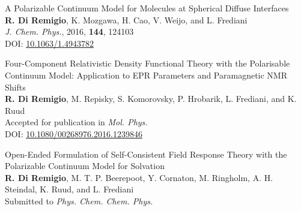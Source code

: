{\Large
\noindent\textsf{A Polarizable Continuum Model for Molecules at Spherical
Diffuse Interfaces
}
\\
    \textbf{R. Di Remigio}, K. Mozgawa, H. Cao, V. Weijo, and L.
    Frediani
\\
    \textit{J. Chem. Phys.}, \textrm{2016}, \textbf{144}, 124103
  \\
  DOI: \href{http://dx.doi.org/10.1063/1.4943782}{10.1063/1.4943782}
}
\vspace*{\fill}



\thispagestyle{empty}
\vspace*{\fill}
\begin{flushright}
{\Huge{}}
\end{flushright}

{\Large
\noindent\textsf{Four-Component Relativistic Density Functional Theory with the
Polarisable Continuum Model: Application to EPR Parameters
and Paramagnetic NMR Shifts
}
\\
  \textbf{R. Di Remigio}, M. Repisky, S. Komorovsky, P. Hrobarik, L.
  Frediani, and K. Ruud
\\
  Accepted for publication in \textit{Mol. Phys.}
  \\
  DOI: \href{http://dx.doi.org/10.1080/00268976.2016.1239846}{10.1080/00268976.2016.1239846}
}
\vspace*{\fill}



\thispagestyle{empty}
\vspace*{\fill}
\begin{flushright}
{\Huge{}}
\end{flushright}

{\Large
\noindent\textsf{Open-Ended Formulation of Self-Consistent Field Response Theory with
the Polarizable Continuum Model for Solvation
}
\\
    \textbf{R. Di Remigio}, M. T. P. Beerepoot, Y. Cornaton, M. Ringholm,
    A. H. Steindal, K. Ruud, and L. Frediani
\\
    Submitted to \textit{Phys. Chem. Chem. Phys.}
}
\vspace*{\fill}


